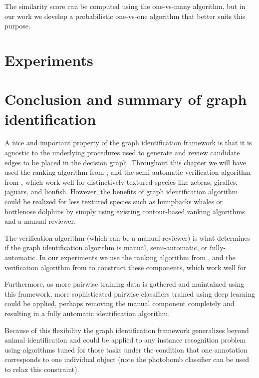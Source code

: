     The similarity score can be computed using the one-vs-many algorithm, but
      in our work we develop a probabilistic one-vs-one algorithm that better
      suits this purpose.

\section{Experiments}\label{sec:graphexpt}
 
\section{Conclusion and summary of graph identification}\label{sec:graphconclusion}

A nice and important property of the graph identification framework is
  that it is agnostic to the underlying procedures used to generate and review
  candidate edges to be placed in the decision graph.
Throughout this chapter we will have used the ranking algorithm from
  , and the semi-automatic verification algorithm from
  , which work well for distinctively textured species like
  zebras, giraffes, jaguars, and lionfish.
However, the benefits of graph identification algorithm could be realized for
  less textured species such as humpbacks whales or bottlenose dolphins by
  simply using existing contour-based ranking algorithms and a manual reviewer.

The verification algorithm (which can be a manual reviewer) is what determines
  if the graph identification algorithm is manual, semi-automatic, or
  fully-automatic.
In our experiments we use the ranking algorithm from , and
  the verification algorithm from  to construct these
  components, which work well for
  
Furthermore, as more pairwise training data is gathered and maintained using
  this framework, more sophisticated pairwise classifiers trained using deep
  learning could be applied, perhaps removing the manual component completely
  and resulting in a fully automatic identification algorithm.

Because of this flexibility the graph identification framework generalizes
  beyond animal identification and could be applied to any instance recognition
  problem using algorithms tuned for those tasks under the condition that one
  annotation corresponds to one individual object (note the photobomb classifier
  can be used to relax this constraint).


